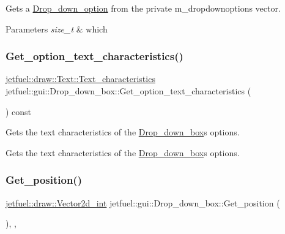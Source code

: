 Gets a \hyperlink{structjetfuel_1_1gui_1_1Drop__down__box_1_1Drop__down__option}{Drop\+\_\+down\+\_\+option} from the private m\+\_\+dropdownoptions vector.


\begin{DoxyParams}{Parameters}
{\em size\+\_\+t} & which \\
\hline
\end{DoxyParams}
\mbox{\label{classjetfuel_1_1gui_1_1Drop__down__box_a8f8bd91ea279110cab98b78854207ae7}} 
\subsubsection{\texorpdfstring{Get\+\_\+option\+\_\+text\+\_\+characteristics()}{Get\_option\_text\_characteristics()}}
{\footnotesize\ttfamily \hyperlink{structjetfuel_1_1draw_1_1Text_1_1Text__characteristics}{jetfuel\+::draw\+::\+Text\+::\+Text\+\_\+characteristics} jetfuel\+::gui\+::\+Drop\+\_\+down\+\_\+box\+::\+Get\+\_\+option\+\_\+text\+\_\+characteristics (\begin{DoxyParamCaption}{ }\end{DoxyParamCaption}) const\hspace{0.3cm}{\ttfamily [inline]}}



Gets the text characteristics of the \hyperlink{classjetfuel_1_1gui_1_1Drop__down__box}{Drop\+\_\+down\+\_\+box}\textquotesingle{}s options. 

Gets the text characteristics of the \hyperlink{classjetfuel_1_1gui_1_1Drop__down__box}{Drop\+\_\+down\+\_\+box}\textquotesingle{}s options. \mbox{\label{classjetfuel_1_1gui_1_1Drop__down__box_af92cccd010b21e1ce64af9a3c58ba086}} 
\subsubsection{\texorpdfstring{Get\+\_\+position()}{Get\_position()}}
{\footnotesize\ttfamily \hyperlink{classjetfuel_1_1draw_1_1Vector2d}{jetfuel\+::draw\+::\+Vector2d\+\_\+int} jetfuel\+::gui\+::\+Drop\+\_\+down\+\_\+box\+::\+Get\+\_\+position (\begin{DoxyParamCaption}{ }\end{DoxyParamCaption})\hspace{0.3cm}{\ttfamily [inline]}, {\ttfamily [override]}, {\ttfamily [virtual]}}



